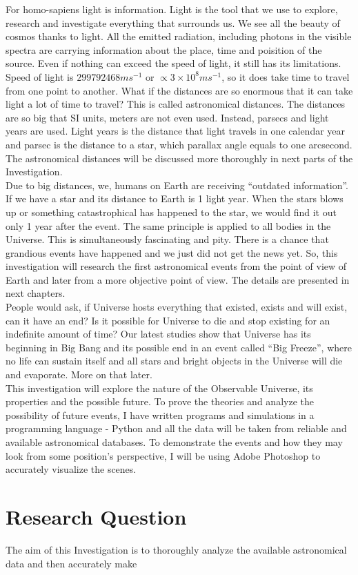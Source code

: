 \documentclass[a4paper]{IEEEtran}
\begin{document}
For homo-sapiens light is information. Light is the tool that we use to explore, research and investigate everything that surrounds us. We see all the beauty of cosmos thanks to light. All the emitted radiation, including photons in the visible spectra are carrying information about the place, time and poisition of the source. Even if nothing can exceed the speed of light, it still has its limitations. Speed of light is $299792468ms^{-1}$ or $\propto 3 \times 10^8ms^{-1}$\cite{speed}, so it does take time to travel from one point to another. What if the distances are so enormous that it can take light a lot of time to travel? This is called astronomical distances. The distances are so big that SI units, meters are not even used. Instead, parsecs and light years are used. Light years is the distance that light travels in one calendar year and parsec is the distance to a star, which parallax angle equals to one arcsecond. The astronomical distances will be discussed more thoroughly in next parts of the Investigation.\\

Due to big distances, we, humans on Earth are receiving ``outdated information''. If we have a star and its distance to Earth is 1 light year. When the stars blows up or something catastrophical has happened to the star, we would find it out only 1 year after the event. The same principle is applied to all bodies in the Universe. This is simultaneously fascinating and pity. There is a chance that grandious events have happened and we just did not get the news yet. So, this investigation will research the first astronomical events from the point of view of Earth and later from a more objective point of view. The details are presented in next chapters.\\

People would ask, if Universe hosts everything that existed, exists and will exist, can it have an end? Is it possible for Universe to die and stop existing for an indefinite amount of time? Our latest studies show that Universe has its beginning in Big Bang and its possible end in an event called ``Big Freeze'', where no life can sustain itself and all stars and bright objects in the Universe will die and evaporate. More on that later.\\

This investigation will explore the nature of the Observable Universe, its properties and the possible future. To prove the theories and analyze the possibility of future events, I have written programs and simulations in a programming language - Python and all the data will be taken from reliable and available astronomical databases. To demonstrate the events and how they may look from some position's perspective, I will be using Adobe Photoshop to accurately visualize the scenes.\\

\section{Research Question}

The aim of this Investigation is to thoroughly analyze the available astronomical data and then accurately make  



\end{document}
